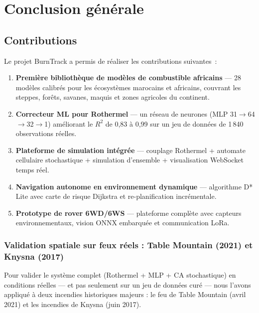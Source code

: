 \section{Conclusion générale}

\subsection*{Contributions}

Le projet BurnTrack a permis de réaliser les contributions suivantes~:

\begin{enumerate}[nosep]
    \item \textbf{Première bibliothèque de modèles de combustible africains} --- 28 modèles calibrés pour les écosystèmes marocains et africains, couvrant les steppes, forêts, savanes, maquis et zones agricoles du continent.
    \item \textbf{Correcteur ML pour Rothermel} --- un réseau de neurones (MLP 31$\rightarrow$64$\rightarrow$32$\rightarrow$1) améliorant le $R^2$ de 0,83 à 0,99 sur un jeu de données de 1\,840 observations réelles.
    \item \textbf{Plateforme de simulation intégrée} --- couplage Rothermel + automate cellulaire stochastique + simulation d'ensemble + visualisation WebSocket temps réel.
    \item \textbf{Navigation autonome en environnement dynamique} --- algorithme D* Lite avec carte de risque Dijkstra et re-planification incrémentale.
    \item \textbf{Prototype de rover 6WD/6WS} --- plateforme complète avec capteurs environnementaux, vision ONNX embarquée et communication LoRa.
\end{enumerate}

\subsubsection{Validation spatiale sur feux réels : Table Mountain (2021) et Knysna (2017)}

Pour valider le système complet (Rothermel + MLP + CA stochastique) en conditions réelles --- et pas seulement sur un jeu de données curé --- nous l'avons appliqué à deux incendies historiques majeurs : le feu de Table Mountain (avril 2021) et les incendies de Knysna (juin 2017).

